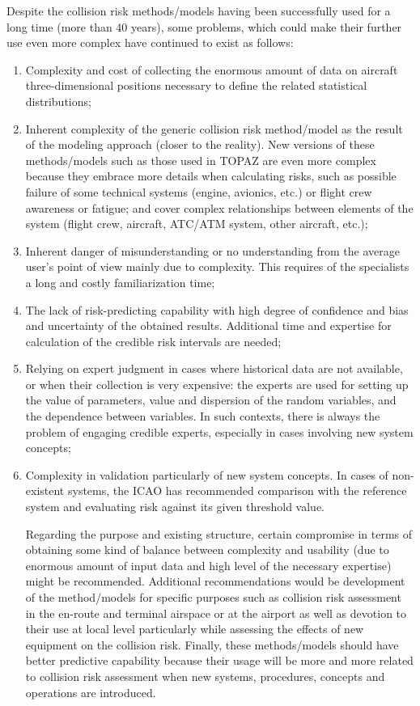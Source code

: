 \documentclass[a4paper, 10pt]{article}
\begin{document}
Despite the collision risk methods/models having been
successfully used for a long time (more than 40 years), some
problems, which could make their further use even more
complex have continued to exist as follows:
\begin{enumerate}
		\item Complexity and cost of collecting the enormous amount
of data on aircraft three-dimensional positions necessary to
define the related statistical distributions;
\item Inherent complexity of the generic collision risk
method/model as the result of the modeling approach (closer to
the reality). New versions of these methods/models such as
those used in TOPAZ are even more complex because they
embrace more details when calculating risks, such as possible
failure of some technical systems (engine, avionics, etc.) or
flight crew awareness or fatigue; and cover complex
relationships between elements of the system (flight crew,
aircraft, ATC/ATM system, other aircraft, etc.);
\item Inherent danger of misunderstanding or no understanding
from the average user’s point of view mainly due to
complexity. This requires of the specialists a long and costly
familiarization time;
\item The lack of risk-predicting capability with high degree of
confidence and bias and uncertainty of the obtained results.
Additional time and expertise for calculation of the credible
risk intervals are needed;
\item Relying on expert judgment in cases where historical
data are not available, or when their collection is very
expensive: the experts are used for setting up the value of
parameters, value and dispersion of the random variables, and
the dependence between variables. In such contexts, there is
always the problem of engaging credible experts, especially in
cases involving new system concepts;
\item Complexity in validation particularly of new system
concepts. In cases of non-existent systems, the ICAO has
recommended comparison with the reference system and
evaluating risk against its given threshold value.\par

Regarding the purpose and existing structure, certain
compromise in terms of obtaining some kind of balance
between complexity and usability (due to enormous amount of
input data and high level of the necessary expertise) might be
recommended. Additional recommendations would be
development of the method/models for specific purposes such
as collision risk assessment in the en-route and terminal
airspace or at the airport as well as devotion to their use at local
level particularly while assessing the effects of new equipment
on the collision risk. Finally, these methods/models should
have better predictive capability because their usage will be
more and more related to collision risk assessment when new
systems, procedures, concepts and operations are introduced.


\end{enumerate}
\end{document}
